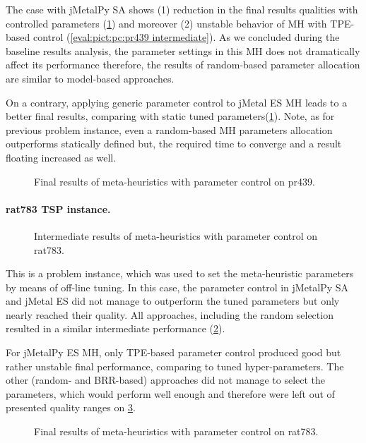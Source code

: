 The case with jMetalPy SA shows (1) reduction in the final results qualities with controlled parameters (\cref{eval:pict:pc:pr439 final}) and moreover (2) unstable behavior of MH with TPE-based control (\cref{eval:pict:pc:pr439 intermediate}). As we concluded during the baseline results analysis, the parameter settings in this MH does not dramatically affect its performance therefore, the results of random-based parameter allocation are similar to model-based approaches.

On a contrary, applying generic parameter control to jMetal ES MH leads to a better final results, comparing with static tuned parameters(\cref{eval:pict:pc:pr439 final}). Note, as for previous problem instance, even a random-based MH parameters allocation outperforms statically defined but, the required time to converge and a result floating increased as well. 
\begin{figure}[b]
	\centering
	
	\caption{Final results of meta-heuristics with parameter control on pr439.}
	\label{eval:pict:pc:pr439 final}
\end{figure}

\newpage
\paragraph{rat783 TSP instance.}
\begin{figure}[t]
	\centering
	
	\caption{Intermediate results of meta-heuristics with parameter control on rat783.}
	\label{eval:pict:pc:rat783 intermediate}
\end{figure}

This is a problem instance, which was used to set the meta-heuristic parameters by means of off-line tuning. In this case, the parameter control in jMetalPy SA and jMetal ES did not manage to outperform the tuned parameters but only nearly reached their quality. All approaches, including the random selection resulted in a similar intermediate performance (\cref{eval:pict:pc:rat783 intermediate}).

For jMetalPy ES MH, only TPE-based parameter control produced good but rather unstable final performance, comparing to tuned hyper-parameters. The other (random- and BRR-based) approaches did not manage to select the parameters, which would perform well enough and therefore were left out of presented quality ranges on \cref{eval:pict:pc:rat783 final}.

\begin{figure}[b]
	\centering
	
	\caption{Final results of meta-heuristics with parameter control on rat783.}
	\label{eval:pict:pc:rat783 final}
\end{figure}

